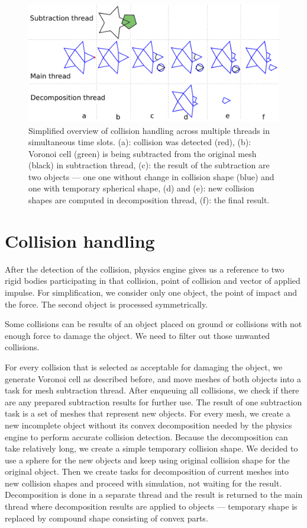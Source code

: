 \begin{figure}
        \centering
        \includegraphics[width=\textwidth]{img/object-progress}
       \caption{Simplified overview of collision handling across multiple threads in simultaneous time slots. (a): collision was detected (red), (b): Voronoi cell (green) is being subtracted from the original mesh (black) in subtraction thread, (c): the result of the subtraction are two objects --- one one without change in collision shape (blue) and one with temporary spherical shape, (d) and (e): new collision shapes are computed in decomposition thread, (f): the final result.}
        \label{fig:objectInThreads}
\end{figure}

\section{Collision handling}
\label{sec:collisions}
After the detection of the collision, physics engine gives us a reference to two rigid bodies participating in that collision, point of collision and vector of applied impulse. For simplification, we consider only one object, the point of impact and the force. The second object is processed symmetrically.

Some collisions can be results of an object placed on ground or collisions with not enough force to damage the object. We need to filter out those unwanted collisions.

For every collision that is selected as acceptable for damaging the object, we generate Voronoi cell as described before, and move meshes of both objects into a task for mesh subtraction thread. After enqueuing all collisions, we check if there are any prepared subtraction results for further use. The result of one subtraction task is a set of meshes that represent new objects. For every mesh, we create a new incomplete object without its convex decomposition needed by the physics engine to perform accurate collision detection. Because the decomposition can take relatively long, we create a simple temporary collision shape. We decided to use a sphere for the new objects and keep using original  collision shape for the original object. Then we create tasks for decomposition of current meshes into new collision shapes and proceed with simulation, not waiting for the result. Decomposition is done in a separate thread and the result is returned to the main thread where decomposition results are applied to objects --- temporary shape is replaced by compound shape consisting of convex parts.

